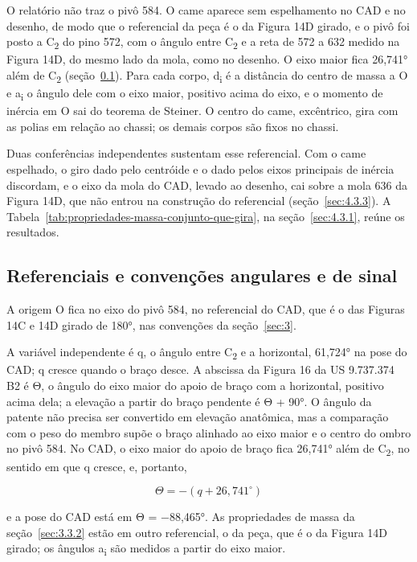 O relatório não traz o pivô 584. O came aparece sem espelhamento no CAD e no desenho, de modo que o referencial da peça é o da Figura 14D girado, e o pivô foi posto a C\textsubscript{2} do pino 572, com o ângulo entre C\textsubscript{2} e a reta de 572 a 632 medido na Figura 14D, do mesmo lado da mola, como no desenho. O eixo maior fica 26,741° além de C\textsubscript{2} (seção~\ref{sec:3.3.3}). Para cada corpo, d\textsubscript{i} é a distância do centro de massa a O e a\textsubscript{i} o ângulo dele com o eixo maior, positivo acima do eixo, e o momento de inércia em O sai do teorema de Steiner. O centro do came, excêntrico, gira com as polias em relação ao chassi; os demais corpos são fixos no chassi.

Duas conferências independentes sustentam esse referencial. Com o came espelhado, o giro dado pelo centróide e o dado pelos eixos principais de inércia discordam, e o eixo da mola do CAD, levado ao desenho, cai sobre a mola 636 da Figura 14D, que não entrou na construção do referencial (seção~\ref{sec:4.3.3}). A Tabela~\ref{tab:propriedades-massa-conjunto-que-gira}, na seção~\ref{sec:4.3.1}, reúne os resultados.

\subsection{Referenciais e convenções angulares e de sinal}\label{sec:3.3.3}

A origem O fica no eixo do pivô 584, no referencial do CAD, que é o das Figuras 14C e 14D girado de 180°, nas convenções da seção~\ref{sec:3}.

A variável independente é q, o ângulo entre C\textsubscript{2} e a horizontal, 61,724° na pose do CAD; q cresce quando o braço desce. A abscissa da Figura 16 da US 9.737.374 B2 é Θ, o ângulo do eixo maior do apoio de braço com a horizontal, positivo acima dela; a elevação a partir do braço pendente é Θ + 90°. O ângulo da patente não precisa ser convertido em elevação anatômica, mas a comparação com o peso do membro supõe o braço alinhado ao eixo maior e o centro do ombro no pivô 584. No CAD, o eixo maior do apoio de braço fica 26,741° além de C\textsubscript{2}, no sentido em que q cresce, e, portanto,

\begin{equation}
  \Theta = - (q + 26{,}741^{\circ})
  \label{eq:55}
\end{equation}

e a pose do CAD está em Θ = −88,465°. As propriedades de massa da seção~\ref{sec:3.3.2} estão em outro referencial, o da peça, que é o da Figura 14D girado; os ângulos a\textsubscript{i} são medidos a partir do eixo maior.

